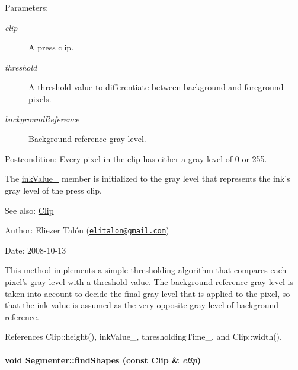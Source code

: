 \begin{Desc}
\item[Parameters:]
\begin{description}
\item[{\em clip}]A press clip. \item[{\em threshold}]A threshold value to differentiate between background and foreground pixels. \item[{\em backgroundReference}]Background reference gray level.\end{description}
\end{Desc}
\begin{Desc}
\item[Postcondition:]Every pixel in the clip has either a gray level of 0 or 255. 

The \hyperlink{class_segmenter_fa6183f99aa6011399783652b341a43b}{inkValue\_\-} member is initialized to the gray level that represents the ink's gray level of the press clip.\end{Desc}
\begin{Desc}
\item[See also:]\hyperlink{class_clip}{Clip}\end{Desc}
\begin{Desc}
\item[Author:]Eliezer Talón (\href{mailto:elitalon@gmail.com}{\tt elitalon@gmail.com}) \end{Desc}
\begin{Desc}
\item[Date:]2008-10-13\end{Desc}
This method implements a simple thresholding algorithm that compares each pixel's gray level with a threshold value. The background reference gray level is taken into account to decide the final gray level that is applied to the pixel, so that the ink value is assumed as the very opposite gray level of background reference. 

References Clip::height(), inkValue\_\-, thresholdingTime\_\-, and Clip::width().\hypertarget{class_segmenter_465c8e755bb56d247add080a04377520}{
\paragraph[findShapes]{\setlength{\rightskip}{0pt plus 5cm}void Segmenter::findShapes (const {\bf Clip} \& {\em clip})}\hfill}
\label{class_segmenter_465c8e755bb56d247add080a04377520}


